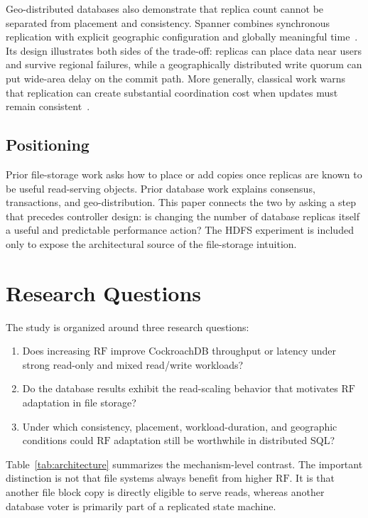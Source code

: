 \documentclass[a4paper,10pt,twocolumn]{article}
\newcommand{\rf}{\ensuremath{\mathrm{RF}}}
\newcommand{\cockroach}{CockroachDB}
\newcommand{\hdfs}{HDFS}
\begin{document}
Geo-distributed databases also demonstrate that replica count cannot be
separated from placement and consistency. Spanner combines synchronous
replication with explicit geographic configuration and globally meaningful
time~\citep{corbett2012spanner}. Its design illustrates both sides of the
trade-off: replicas can place data near users and survive regional failures,
while a geographically distributed write quorum can put wide-area delay on
the commit path. More generally, classical work warns that replication can
create substantial coordination cost when updates must remain
consistent~\citep{gray1996dangers}.

\subsection{Positioning}

Prior file-storage work asks how to place or add copies once replicas are known
to be useful read-serving objects. Prior database work explains consensus,
transactions, and geo-distribution. This paper connects the two by asking a
step that precedes controller design: is changing the number of database
replicas itself a useful and predictable performance action? The \hdfs{}
experiment is included only to expose the architectural source of the
file-storage intuition.

\section{Research Questions}
\label{sec:questions}

The study is organized around three research questions:

\begin{enumerate}[label=\textbf{RQ\arabic*.},leftmargin=*]
  \item Does increasing \rf{} improve \cockroach{} throughput
  or latency under strong read-only and mixed read/write workloads?
  \item Do the database results exhibit the read-scaling
  behavior that motivates \rf{} adaptation in file storage?
  \item Under which consistency, placement, workload-duration,
  and geographic conditions could \rf{} adaptation still be worthwhile in
  distributed SQL?
\end{enumerate}

Table~\ref{tab:architecture} summarizes the mechanism-level contrast. The
important distinction is not that file systems always benefit from higher
\rf{}. It is that another file block copy is directly eligible to serve reads,
whereas another database voter is primarily part of a replicated state
machine.
\end{document}
